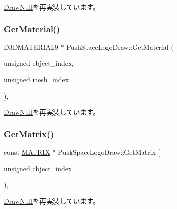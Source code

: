 \mbox{\hyperlink{class_draw_null_a8496ed1b1f765a331a8f1704122b8ca4}{Draw\+Null}}を再実装しています。

\mbox{\label{class_push_space_logo_draw_a0734eed4096afb12e6c9ef1f4d82b9d8}} 
\subsubsection{\texorpdfstring{Get\+Material()}{GetMaterial()}}
{\footnotesize\ttfamily D3\+D\+M\+A\+T\+E\+R\+I\+A\+L9 $\ast$ Push\+Space\+Logo\+Draw\+::\+Get\+Material (\begin{DoxyParamCaption}\item[{unsigned}]{object\+\_\+index,  }\item[{unsigned}]{mesh\+\_\+index }\end{DoxyParamCaption})\hspace{0.3cm}{\ttfamily [override]}, {\ttfamily [virtual]}}



\mbox{\hyperlink{class_draw_null_a84969d22d3436986f214e9896fe44fc6}{Draw\+Null}}を再実装しています。

\mbox{\label{class_push_space_logo_draw_a1ab6229ba2d68b730797f5016c99f359}} 
\subsubsection{\texorpdfstring{Get\+Matrix()}{GetMatrix()}}
{\footnotesize\ttfamily const \mbox{\hyperlink{_vector3_d_8h_a032295cd9fb1b711757c90667278e744}{M\+A\+T\+R\+IX}} $\ast$ Push\+Space\+Logo\+Draw\+::\+Get\+Matrix (\begin{DoxyParamCaption}\item[{unsigned}]{object\+\_\+index }\end{DoxyParamCaption})\hspace{0.3cm}{\ttfamily [override]}, {\ttfamily [virtual]}}



\mbox{\hyperlink{class_draw_null_adede079e9c11a756090740b20bb43022}{Draw\+Null}}を再実装しています。

